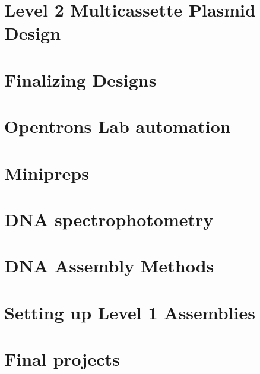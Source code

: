 \documentclass[
  letterpaper,
  DIV=11,
  numbers=noendperiod]{scrreprt}
\begin{document}

\chapter{Level 2 Multicassette Plasmid
Design}\label{level-2-multicassette-plasmid-design}


\chapter{Finalizing Designs}\label{finalizing-designs}


\chapter{Opentrons Lab automation}\label{opentrons-lab-automation}


\chapter{Minipreps}\label{minipreps}


\chapter{DNA spectrophotometry}\label{dna-spectrophotometry}


\chapter{DNA Assembly Methods}\label{dna-assembly-methods}


\chapter{Setting up Level 1
Assemblies}\label{setting-up-level-1-assemblies}


\chapter{Final projects}\label{final-projects}
\end{document}
